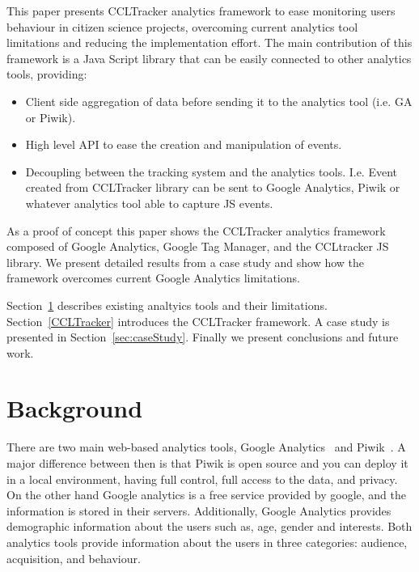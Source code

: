 \documentclass{article}
\begin{document}
This paper presents CCLTracker analytics framework to ease monitoring users behaviour in citizen science projects, overcoming current analytics tool limitations and reducing the implementation effort. The main contribution of this framework is a Java Script library that can be easily connected to other analytics tools, providing:

\begin{itemize}
\item Client side aggregation of data before sending it to the analytics tool (i.e. GA or Piwik). 
\item High level API to ease the creation and manipulation of events. 
\item Decoupling between the tracking system and the analytics tools. I.e. Event created from CCLTracker library can be sent to Google Analytics, Piwik or whatever analytics tool able to capture JS events. 
\end{itemize}


As a proof of concept this paper shows the CCLTracker analytics framework composed of Google Analytics, Google Tag Manager, and the CCLtracker JS library. We present detailed results from a case study and show how the framework overcomes current Google Analytics limitations. 
 
Section~\ref{sec:related} describes existing analtyics tools and their limitations. Section~\ref{CCLTracker} introduces the CCLTracker framework. A case study is presented in Section~\ref{sec:caseStudy}. Finally we present conclusions and future work. 
 

\section{Background}\label{sec:related}


   
   
There are two main web-based analytics tools, Google Analytics~\cite{} and Piwik~\cite{}. A major difference between then is that Piwik is open source and you can deploy it in a local environment, having full control, full access to the data, and privacy. On the other hand Google analytics is a free service provided by google, and the information is stored in their servers. Additionally, Google Analytics provides demographic information about the users such as, age, gender and interests. Both analytics tools provide information about the users in three categories: audience, acquisition, and behaviour.
\end{document}
